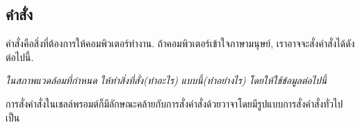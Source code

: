\begin{thwbr}
%
%
%


\subsection{คำสั่ง}
คำสั่งคือสิ่งที่ต้องการให้คอมพิวเตอร์ทำงาน. ถ้าคอมพิวเตอร์เข้าใจภาษามนุษย์, เราอาจจะสั่งคำสั่งได้ดังต่อไปนี้.

\begin{MyVerbatim}
{\thaitext\it ในสภาพแวดล้อมที่กำหนด} {\thaitext\it ให้ทำสิ่งที่สั่ง(ทำอะไร)} {\thaitext\it แบบนี้(ทำอย่างไร)} {\thaitext\it โดยให้ใช้ข้อมูลต่อไปนี้}
\end{MyVerbatim}

การสั่งคำสั่งในเชลล์พรอมต์ก็มีลักษณะคล้ายกับการสั่งคำสั่งด้วยวาจาโดยมีรูปแบบการสั่งคำสั่งทั่วไปเป็น




\end{thwbr}

